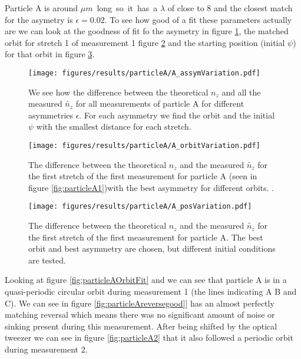 Particle A is around \unit[24]{$\mu m$} long so it has a $\lambda$ of close to 8 and the closest match for the asymetry is $\epsilon = 0.02$. To see how good of a fit these parameters actually are we can look at the goodness of fit fo the asymetry in figure \ref{fig:asymVariation}, the matched orbit for stretch 1 of measurement 1 figure \ref{fig:orbitVariation} and the starting position (initial $\psi$) for that orbit in figure \ref{fig:initVariation}.  

\begin{figure}[H]
\begin{center}
\texttt{[image: figures/results/particleA/A\_assymVariation.pdf]}
\end{center}
\caption{We see how the difference between the theoretical $n_z$ and all the measured  $\widetilde{n_z}$ for all measurements of particle A for different asymmetries $\epsilon$. For each asymmetry we find the orbit and the initial $\psi$ with the smallest distance for each stretch.}
\label{fig:asymVariation}
\end{figure}

\begin{figure}[H]
\begin{center}
\texttt{[image: figures/results/particleA/A\_orbitVariation.pdf]}
\end{center}
\caption{The difference between the theoretical $n_z$ and the measured $\widetilde{n_z}$ for the first stretch of the first measurement for particle A (seen in figure \ref{fig:particleA1})with the best asymmetry for different orbits. .}
\label{fig:orbitVariation}
\end{figure}


\begin{figure}[H]
\begin{center}
\texttt{[image: figures/results/particleA/A\_posVariation.pdf]}
\end{center}
\caption{The difference between the theoretical $n_z$ and the measured $\widetilde{n_z}$ for the first stretch of the first measurement for particle A. The best orbit and best asymmetry are chosen, but different initial conditions are tested. }
\label{fig:initVariation}
\end{figure}


Looking at figure \ref{fig:particleAOrbitFit} and we can see that particle A is in a quasi-periodic circular orbit during measurement 1 (the lines indicating A B and C). We can see in figure \ref{fig:particleAreversegood}] has an almost perfectly matching reversal which means there was no significant amount of noise or sinking present during this measurement. After being shifted by  the optical tweezer we can see in figure \ref{fig:particleA2} that it also followed a periodic orbit during measurement 2. 



